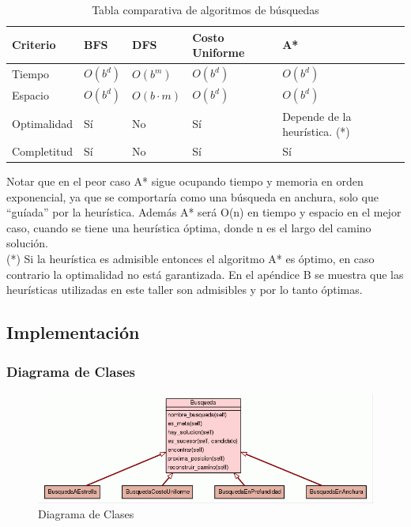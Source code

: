 \documentclass[letter, titlepage, 10pt]{article}
\begin{document}
\begin{table}[H]
\begin{center}

\begin{tabular}{|l|l|l|l|l|}
\hline
\textbf{Criterio} & \textbf{BFS}           & \textbf{DFS}           & \textbf{Costo Uniforme} & \textbf{A*}               \\ \hline
Tiempo            & $O(b^d)$ & $O(b^m)$ & $O(b^d)$  & $O(b^d)$    \\ \hline
Espacio           & $O(b^d)$ & $O(b\cdot m)$            & $O(b^d)$  & $O(b^d)$    \\ \hline
Optimalidad       & Sí                     & No                     & Sí                      & Depende de la heurística. {\small(*)} \\ \hline
Completitud       & Sí                     & No                     & Sí                      & Sí                        \\ \hline
\end{tabular}
\caption{Tabla comparativa de algoritmos de búsquedas}
\end{center}

\end{table}

Notar que en el peor caso A* sigue ocupando tiempo y memoria en orden exponencial, ya que se comportaría como una búsqueda en anchura, solo que ``guíada'' por la heurística. 
Además A* será O(n) en tiempo y espacio en el mejor caso, cuando se tiene una heurística óptima, donde n es el largo del camino solución.\\

{\small(*)} Si la heurística es admisible entonces el algoritmo A* es óptimo, en caso contrario la optimalidad no está garantizada. En el apéndice B se muestra que las heurísticas utilizadas en este taller son admisibles y por lo tanto óptimas.

\newpage
\subsection{Implementación}
\subsubsection{Diagrama de Clases}
\begin{figure}[ht]
    \begin{center}
        \includegraphics[scale = 0.5]{images/diagram_busq}
        \caption{Diagrama de Clases}
    \end{center}
\end{figure}
\end{document}
